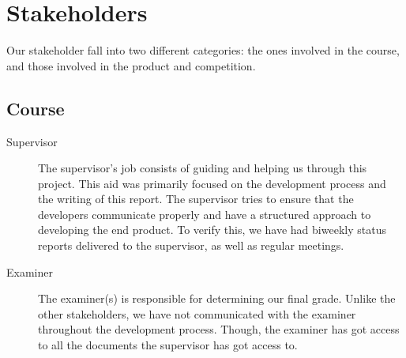 \section{Stakeholders}
Our stakeholder fall into two different categories: the ones involved in the
course, and those involved in the product and competition.

\subsection{Course}
\begin{description}
\item[Supervisor]
The supervisor's job consists of guiding and helping us
through this project. This aid was primarily focused on the development
process and the writing of this report. The supervisor tries to ensure
that the developers communicate properly and have a structured approach
to developing the end product. To verify this, we have had biweekly
status reports delivered to the supervisor, as well as regular
meetings.

\item[Examiner]
The examiner(s) is responsible for determining our final grade. Unlike
the other stakeholders, we have not communicated with the examiner
throughout the development process. Though, the examiner has got access
to all the documents the supervisor has got access to.
\end{description}

